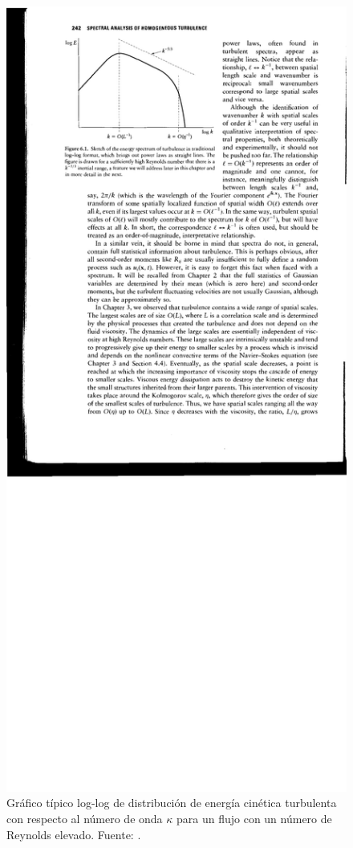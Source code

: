 \begin{figure}[h!]
	\centering
	\includegraphics[width=0.85\linewidth,trim={3.2cm 18.3cm 7.0cm 1.5cm},clip]{Imagenes/03/spectra}
	\caption{Gráfico típico log-log de distribución de energía cinética turbulenta con respecto al número de onda $\kappa$ para un flujo con un número de Reynolds elevado. Fuente: \cite{9780521775380}.}
	\label{fig:03_spectra}
\end{figure}

